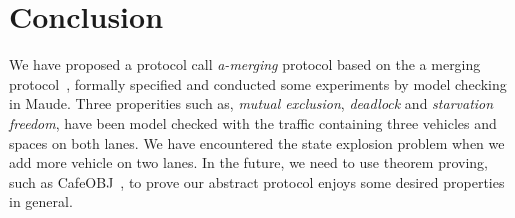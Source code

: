 \documentclass[10pt, conference, compsocconf]{IEEEtran}
\begin{document}
 








\section{Conclusion}
\label{concl_sect}

We have proposed a protocol call \textit{a-merging} protocol based on the a merging protocol~\cite{10.1145/3055004.3055028}, formally specified and conducted some experiments by model checking in Maude.
Three properities such as, \textit{mutual exclusion}, \textit{deadlock} and \textit{starvation freedom}, have been model checked with the traffic containing three vehicles and spaces on both lanes.
We have encountered the state explosion problem when we add more vehicle on two lanes.
In the future, we need to use theorem proving, such as CafeOBJ~\cite{DiaconescuF98}, to prove our abstract protocol enjoys some desired properties in general.


%
%

\end{document}
